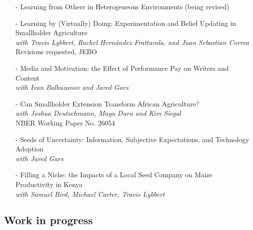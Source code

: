 \documentclass[11pt]{article}
\begin{document}
\begin{itemize}[itemsep=0pt, leftmargin=20pt]
\item [-]Learning from Others in Heterogeneous Environments (being revised)
\item [-]Learning by (Virtually) Doing: Experimentation and Belief Updating in Smallholder Agriculture \\ 
\emph{with Travis Lybbert, Rachel Hern\'{a}ndez Frattarola, and Juan Sebastian Correa}\\
Revisions requested, JEBO
\item [-]{Media and Motivation: the Effect of
Performance Pay on Writers and Content} \\
\emph{with Ivan Balbuzanov and Jared Gars}
\item [-]{Can Smallholder Extension Transform African Agriculture?}\\
\emph{with Joshua Deutschmann, Maya Duru and Kim Siegal} \\
NBER Working Paper No. 26054
\item [-]{Seeds of Uncertainty: Information, Subjective Expectations, and Technology Adoption}\\
\emph{with Jared Gars}
\item [-]Filling a Niche: the Impacts of a Local Seed Company on Maize Productivity in Kenya\\
\emph{with Samuel Bird, Michael Carter, Travis Lybbert}
\end{itemize}

\subsection*{\sc Work in progress}
\end{document}
